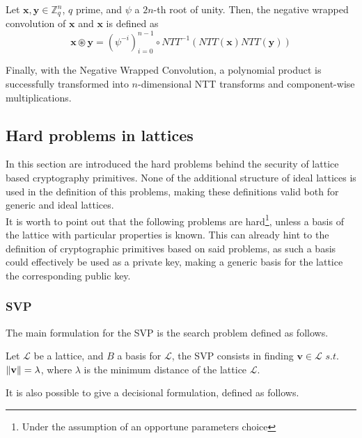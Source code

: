 \begin{definition}
Let $\mathbf{x},\mathbf{y}\in\mathbb{Z}_q^n$, $q$ prime, and $\psi$ a $2n$-th root of unity. Then, the negative wrapped convolution of $\mathbf{x}$ and $\mathbf{x}$ is defined as
\begin{equation*}
\mathbf{x}\circledast\mathbf{y} = (\psi^{-i})_{i=0}^{n-1}\circ NTT^{-1}(NTT(\mathbf{x})NTT(\mathbf{y}))
\end{equation*}
\end{definition}

Finally, with the Negative Wrapped Convolution, a polynomial product is successfully transformed into $n$-dimensional NTT transforms and component-wise multiplications.

\subsection{Hard problems in lattices}\label{sec:bg:prob}
In this section are introduced the hard problems behind the security of lattice based cryptography primitives. None of the additional structure of ideal lattices is used in the definition of this problems, making these definitions valid both for generic and ideal lattices.\\
It is worth to point out that the following problems are hard\footnote{Under the assumption of an opportune parameters choice}, unless a basis of the lattice with particular properties is known. This can already hint to the definition of cryptographic primitives based on said problems, as such a basis could effectively be used as a private key, making a generic basis for the lattice the corresponding public key.

\subsubsection{SVP}

The main formulation for the SVP is the search problem defined as follows.

\begin{definition}
Let $\mathscr{L}$ be a lattice, and $B$ a basis for $\mathscr{L}$, the SVP consists in finding $\mathbf{v}\in\mathscr{L}$ $s.t.$ $\left\lVert \mathbf{v} \right\rVert = \lambda$, where $\lambda$ is the minimum distance of the lattice $\mathscr{L}$.
\end{definition}

It is also possible to give a decisional formulation, defined as follows.

